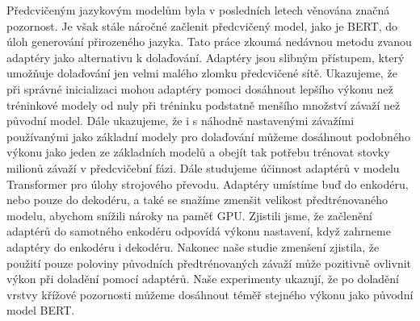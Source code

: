 Předcvičeným jazykovým modelům byla v posledních letech věnována značná pozornost. Je však stále náročné začlenit předcvičený model, jako je BERT, do úloh generování přirozeného jazyka. Tato práce zkoumá nedávnou metodu zvanou adaptéry jako alternativu k dolaďování. Adaptéry jsou slibným přístupem, který umožňuje dolaďování jen velmi malého zlomku předcvičené sítě.
Ukazujeme, že při správné inicializaci mohou adaptéry pomoci dosáhnout lepšího výkonu než tréninkové modely od nuly při tréninku podstatně menšího množství závaží než původní model.
Dále ukazujeme, že i s náhodně nastavenými závažími používanými jako základní modely pro dolaďování můžeme dosáhnout podobného výkonu jako jeden ze základních modelů a obejít tak potřebu trénovat stovky milionů závaží v předcvičební fázi.
Dále studujeme účinnost adaptérů v modelu Transformer pro úlohy strojového převodu. Adaptéry umístíme buď do enkodéru, nebo pouze do dekodéru, a také se snažíme zmenšit velikost předtrénovaného modelu, abychom snížili nároky na paměť GPU.
Zjistili jsme, že začlenění adaptérů do samotného enkodéru odpovídá výkonu nastavení, když zahrneme adaptéry do enkodéru i dekodéru.
Nakonec naše studie zmenšení zjistila, že použití pouze poloviny původních předtrénovaných závaží může pozitivně ovlivnit výkon při doladění pomocí adaptérů. Naše experimenty ukazují, že po doladění vrstvy křížové pozornosti můžeme dosáhnout téměř stejného výkonu jako původní model BERT.